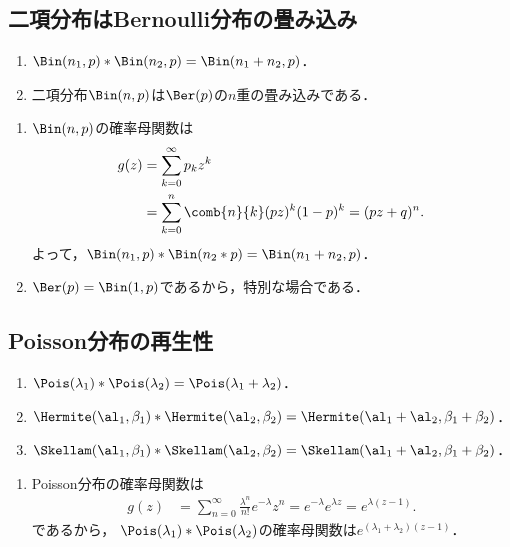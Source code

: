 \documentclass[uplatex,dvipdfmx]{jsreport}
\begin{document}
\subsection{二項分布はBernoulli分布の畳み込み}

\begin{proposition}\mbox{}
    \begin{enumerate}
        \item $\Bin(n_1,p)*\Bin(n_2,p)=\Bin(n_1+n_2,p)$．
        \item 二項分布$\Bin(n,p)$は$\Ber(p)$の$n$重の畳み込みである．
    \end{enumerate}
\end{proposition}
\begin{Proof}\mbox{}
    \begin{enumerate}
        \item $\Bin(n,p)$の確率母関数は
        \begin{align*}
            g(z)&=\sum_{k=0}^\infty p_kz^k\\
            &=\sum_{k=0}^n\comb{n}{k}(pz)^k(1-p)^k=(pz+q)^n.
        \end{align*}
        よって，$\Bin(n_1,p)*\Bin(n_2*p)=\Bin(n_1+n_2,p)$．
        \item $\Ber(p)=\Bin(1,p)$であるから，特別な場合である．
    \end{enumerate}
\end{Proof}

\subsection{Poisson分布の再生性}

\begin{proposition}\mbox{}
    \begin{enumerate}
        \item $\Pois(\lambda_1)*\Pois(\lambda_2)=\Pois(\lambda_1+\lambda_2)$．
        \item $\Hermite(\al_1,\beta_1)*\Hermite(\al_2,\beta_2)=\Hermite(\al_1+\al_2,\beta_1+\beta_2)$．
        \item $\Skellam(\al_1,\beta_1)*\Skellam(\al_2,\beta_2)=\Skellam(\al_1+\al_2,\beta_1+\beta_2)$．
    \end{enumerate}
\end{proposition}
\begin{Proof}\mbox{}
    \begin{enumerate}
        \item Poisson分布の確率母関数は
        \begin{align*}
            g(z)&=\sum_{n=0}^\infty\frac{\lambda^n}{n!}e^{-\lambda}z^n=e^{-\lambda}e^{\lambda z}=e^{\lambda(z-1)}.
        \end{align*}
        であるから，
        $\Pois(\lambda_1)*\Pois(\lambda_2)$の確率母関数は$e^{(\lambda_1+\lambda_2)(z-1)}$．
    \end{enumerate}
\end{Proof}
\end{document}
